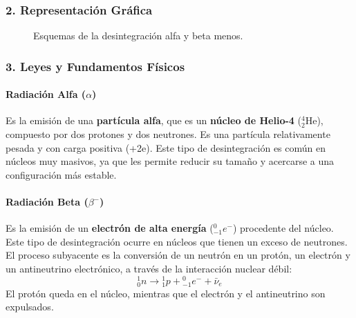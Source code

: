 \subsubsection*{2. Representación Gráfica}
\begin{figure}[H]
    \centering
    \hfill
    \caption{Esquemas de la desintegración alfa y beta menos.}
\end{figure}

\subsubsection*{3. Leyes y Fundamentos Físicos}
\paragraph{Radiación Alfa ($\alpha$)}
Es la emisión de una \textbf{partícula alfa}, que es un \textbf{núcleo de Helio-4} (${}_{2}^{4}\text{He}$), compuesto por dos protones y dos neutrones. Es una partícula relativamente pesada y con carga positiva (+2e). Este tipo de desintegración es común en núcleos muy masivos, ya que les permite reducir su tamaño y acercarse a una configuración más estable.

\paragraph{Radiación Beta ($\beta^{-}$)}
Es la emisión de un \textbf{electrón de alta energía} (${}_{-1}^{0}e^{-}$) procedente del núcleo. Este tipo de desintegración ocurre en núcleos que tienen un exceso de neutrones. El proceso subyacente es la conversión de un neutrón en un protón, un electrón y un antineutrino electrónico, a través de la interacción nuclear débil:
$$ {}_{0}^{1}n \to {}_{1}^{1}p + {}_{-1}^{0}e^{-} + \bar{\nu}_e $$
El protón queda en el núcleo, mientras que el electrón y el antineutrino son expulsados.


